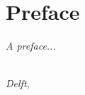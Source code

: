\chapter*{Preface}

\emph{A preface...}

\begin{flushright}
{\makeatletter\itshape
    \@author \\
    Delft, \monthname{} \the\year{}
\makeatother}
\end{flushright}

